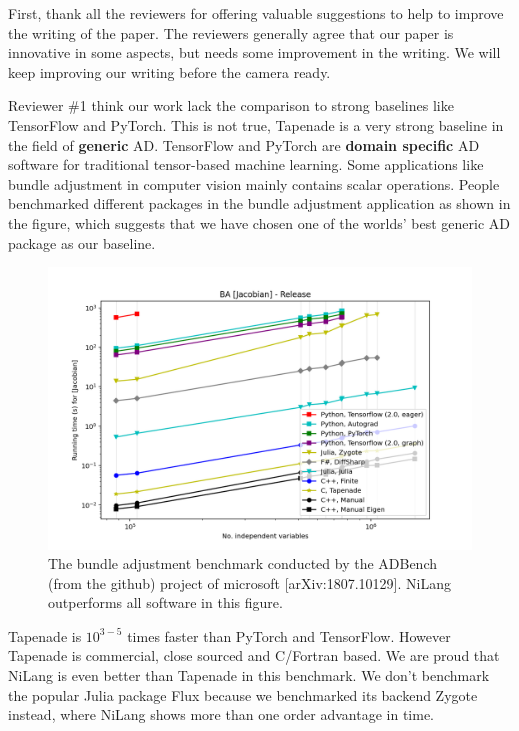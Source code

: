 \documentclass{article}
\begin{document}
First, thank all the reviewers for offering valuable suggestions to help to improve the writing of the paper.
The reviewers generally agree that our paper is innovative in some aspects, but needs some improvement in the writing.
We will keep improving our writing before the camera ready.

Reviewer \#1 think our work lack the comparison to strong baselines like TensorFlow and PyTorch.
This is not true, Tapenade is a very strong baseline in the field of \textbf{generic} AD.
TensorFlow and PyTorch are \textbf{domain specific} AD software for traditional tensor-based machine learning.
Some applications like bundle adjustment in computer vision mainly contains scalar operations.
People benchmarked different packages in the bundle adjustment application as shown in the figure, which suggests that we have chosen one of the worlds' best generic AD package as our baseline.
\begin{figure}
    \centerline{\includegraphics[width=0.5\columnwidth,trim={0 1cm 1cm 1.7cm},clip]{ba-jacobian-adbench.png}}
    \caption{The bundle adjustment benchmark conducted by the ADBench (from the github) project of microsoft [arXiv:1807.10129]. NiLang outperforms all software in this figure.}\label{bench-ba}
\end{figure}
Tapenade is $10^{3-5}$ times faster than PyTorch and TensorFlow. However Tapenade is commercial, close sourced and C/Fortran based.
We are proud that NiLang is even better than Tapenade in this benchmark.
We don't benchmark the popular Julia package Flux because we benchmarked its backend Zygote instead, where NiLang shows more than one order advantage in time.
\end{document}
